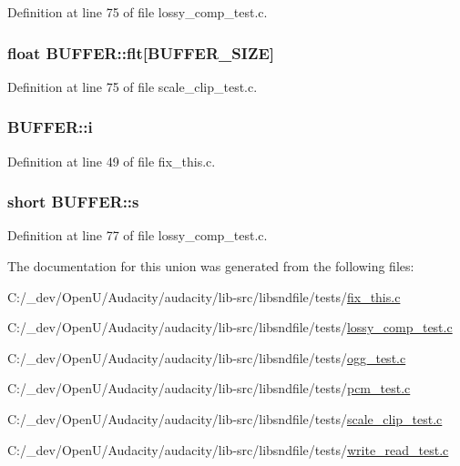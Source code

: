 Definition at line 75 of file lossy\+\_\+comp\+\_\+test.\+c.

\subsubsection[{\texorpdfstring{flt}{flt}}]{\setlength{\rightskip}{0pt plus 5cm}float B\+U\+F\+F\+E\+R\+::flt\mbox{[}{\bf B\+U\+F\+F\+E\+R\+\_\+\+S\+I\+ZE}\mbox{]}}\hypertarget{union_b_u_f_f_e_r_a6318edc9f75c475a04b4d60c6069aa17}{}\label{union_b_u_f_f_e_r_a6318edc9f75c475a04b4d60c6069aa17}


Definition at line 75 of file scale\+\_\+clip\+\_\+test.\+c.

\subsubsection[{\texorpdfstring{i}{i}}]{ B\+U\+F\+F\+E\+R\+::i}\hypertarget{union_b_u_f_f_e_r_a4835f167a59c49203108f8039de7abcd}{}\label{union_b_u_f_f_e_r_a4835f167a59c49203108f8039de7abcd}


Definition at line 49 of file fix\+\_\+this.\+c.

\subsubsection[{\texorpdfstring{s}{s}}]{\setlength{\rightskip}{0pt plus 5cm}short B\+U\+F\+F\+E\+R\+::s}\hypertarget{union_b_u_f_f_e_r_af0c8b6f5f3d01c7d814b2fdf7a0bcdaa}{}\label{union_b_u_f_f_e_r_af0c8b6f5f3d01c7d814b2fdf7a0bcdaa}


Definition at line 77 of file lossy\+\_\+comp\+\_\+test.\+c.



The documentation for this union was generated from the following files\+:\begin{DoxyCompactItemize}
\item 
C\+:/\+\_\+dev/\+Open\+U/\+Audacity/audacity/lib-\/src/libsndfile/tests/\hyperlink{fix__this_8c}{fix\+\_\+this.\+c}\item 
C\+:/\+\_\+dev/\+Open\+U/\+Audacity/audacity/lib-\/src/libsndfile/tests/\hyperlink{lossy__comp__test_8c}{lossy\+\_\+comp\+\_\+test.\+c}\item 
C\+:/\+\_\+dev/\+Open\+U/\+Audacity/audacity/lib-\/src/libsndfile/tests/\hyperlink{ogg__test_8c}{ogg\+\_\+test.\+c}\item 
C\+:/\+\_\+dev/\+Open\+U/\+Audacity/audacity/lib-\/src/libsndfile/tests/\hyperlink{pcm__test_8c}{pcm\+\_\+test.\+c}\item 
C\+:/\+\_\+dev/\+Open\+U/\+Audacity/audacity/lib-\/src/libsndfile/tests/\hyperlink{scale__clip__test_8c}{scale\+\_\+clip\+\_\+test.\+c}\item 
C\+:/\+\_\+dev/\+Open\+U/\+Audacity/audacity/lib-\/src/libsndfile/tests/\hyperlink{write__read__test_8c}{write\+\_\+read\+\_\+test.\+c}\end{DoxyCompactItemize}
